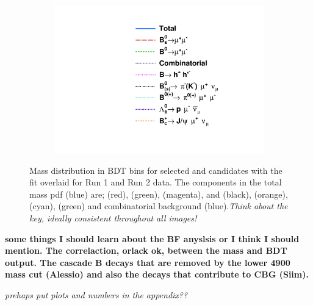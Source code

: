 \begin{figure}[htbp]
    \begin{subfigure}[b]{0.3\textwidth}
       \includegraphics[width=\textwidth]{./Figs/BFAnalysis/Legend.pdf}
    \end{subfigure}
    \caption{Mass distribution in BDT bins for selected \bsmumu and \bdmumu candidates with the fit overlaid for Run 1 and Run 2 data. The components in the total mass pdf (blue) are; \bsmumu (red), \bdmumu (green), \bhh (magenta), \bdpimunu and \bsKmunu (black), \bcjpsimunu (orange), \bpimumu (cyan), \lambdab (green) and combinatorial background (blue).{\it Think about the key, ideally consistent throughout all images! } }
    \label{fig:BFfit}
\end{figure}



{\bf some things I should learn about the BF anyslsis or I think I should mention. The correlaction, orlack ok, between the mass and BDT output. The cascade B decays that are removed by the lower 4900 mass cut (Alessio) and also the decays that contribute to CBG (Siim).}

{\it prehaps put plots and numbers in the appendix??}
